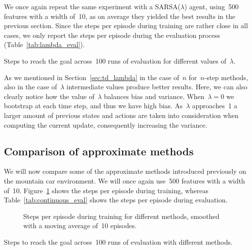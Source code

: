 We once again repeat the same experiment with a SARSA(${\lambda}$) agent, using~500 features with a width of~10, as on average they yielded the best results in the previous section. Since the steps per episode during training are rather close in all cases, we only report the steps per episode during the evaluation process (Table~\ref{tab:lambda_eval}).
\begin{table}
\centering
{}
\caption{Steps to reach the goal across~100 runs of evaluation for different values of~${\lambda}$.}
\label{tab:lambda_eval}
\end{table}

As we mentioned in Section~{\ref{sec:td_lambda}} in the case of~${n}$ for~{${n}$-step} methods, also in the case of~${\lambda}$ intermediate values produce better results. Here, we can also clearly notice how the value of~${\lambda}$ balances bias and variance. When~${\lambda=0}$ we bootstrap at each time step, and thus we have high bias. As~${\lambda}$ approaches~1 a larger amount of previous states and actions are taken into consideration when computing the current update, consequently increasing the variance.

\subsection{Comparison of approximate methods}
We will now compare some of the approximate methods introduced previously on the mountain car environment. We will once again use~500 features with a width of~10. Figure~\ref{fig:continuous_steps} shows the steps per episode during training, whereas Table~\ref{tab:continuous_eval} shows the steps per episode during evaluation.
\begin{figure}
\centering

\caption{Steps per episode during training for different methods, smoothed with a moving average of~10 episodes.}
\label{fig:continuous_steps}
\end{figure}
\begin{table}
\centering
{}
\caption{Steps to reach the goal across~100 runs of evaluation with different methods.}
\label{tab:continuous_eval}
\end{table}

